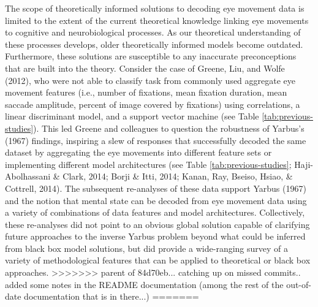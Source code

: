 \documentclass[
  english,
  man, donotrepeattitle,floatsintext]{apa6}
\begin{document}
The scope of theoretically informed solutions to decoding eye movement data is limited to the extent of the current theoretical knowledge linking eye movements to cognitive and neurobiological processes. As our theoretical understanding of these processes develops, older theoretically informed models become outdated. Furthermore, these solutions are susceptible to any inaccurate preconceptions that are built into the theory. Consider the case of Greene, Liu, and Wolfe (2012), who were not able to classify task from commonly used aggregate eye movement features (i.e., number of fixations, mean fixation duration, mean saccade amplitude, percent of image covered by fixations) using correlations, a linear discriminant model, and a support vector machine (see Table \ref{tab:previous-studies}). This led Greene and colleagues to question the robustness of Yarbus's (1967) findings, inspiring a slew of responses that successfully decoded the same dataset by aggregating the eye movements into different feature sets or implementing different model architectures (see Table \ref{tab:previous-studies}; Haji-Abolhassani \& Clark, 2014; Borji \& Itti, 2014; Kanan, Ray, Bseiso, Hsiao, \& Cottrell, 2014). The subsequent re-analyses of these data support Yarbus (1967) and the notion that mental state can be decoded from eye movement data using a variety of combinations of data features and model architectures. Collectively, these re-analyses did not point to an obvious global solution capable of clarifying future approaches to the inverse Yarbus problem beyond what could be inferred from black box model solutions, but did provide a wide-ranging survey of a variety of methodological features that can be applied to theoretical or black box approaches.
>>>>>>> parent of 84d70eb... catching up on missed commits.. added some notes in the README documentation (among the rest of the out-of-date documentation that is in there...)
=======
\end{document}
